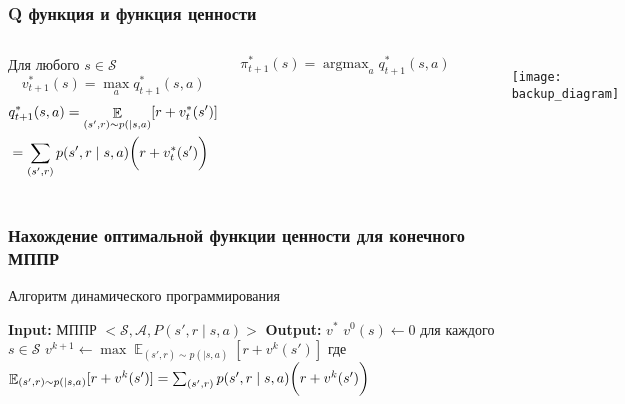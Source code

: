 \documentclass[notheorems]{beamer} %
\DeclareMathOperator*{\argmax}{argmax}
\begin{document}
\begin{frame}
	\frametitle{Q функция и функция ценности}
	\begin{columns}
		
	Для любого $s \in \mathcal{S}$
$$v_{t+1}^*(s) = \max_a q_{t+1}^*(s,a)$$
\begin{align*}
&q_{t+1}^*(s,a) =  \mathop{\mathbb{E}}_{(s',r) \sim p( \mid s,a)}[r + v_t^*(s')]  \\
&= \sum_{(s',r)}p(s',r \mid s,a)\bigg{(}r + v_t^*(s')\bigg{)}
\end{align*}


$$\pi_{t+1}^*(s) = \argmax_a q_{t+1}^*(s,a)$$
		
		\begin{figure}
			\texttt{[image: backup\_diagram]}
		\end{figure}
	\end{columns}

	
\end{frame}
\begin{frame}
	
	\frametitle{Нахождение оптимальной функции ценности для конечного МППР}
	\begin{algorithm}[H]
		\caption{Алгоритм динамического программирования}\label{dp}
		\begin{algorithmic}[1]
			\newline
			\textbf{Input:} МППР  $<\mathcal{S}, \mathcal{A}, P(s',r \mid s,a)>$\newline
			\textbf{Output:} $v^* $
			\State $v^0(s) \gets 0 $ для каждого  $s \in  \mathcal{S}$
			\State $v^{k+1} \gets \max\mathop{\mathbb{E}}_{(s',r) \sim p( \mid s,a)}[r + v^k(s')]$ 
			\State где $\mathop{\mathbb{E}}_{(s',r) \sim p( \mid s,a)}[r + v^k(s')] = \sum_{(s',r)}p(s',r \mid s,a)\bigg{(}r + v^k(s')\bigg{)}$ 
			\EndFor
			\EndProcedure
		\end{algorithmic}
		\label{alg_1}
	\end{algorithm}

\end{frame}
\end{document}
